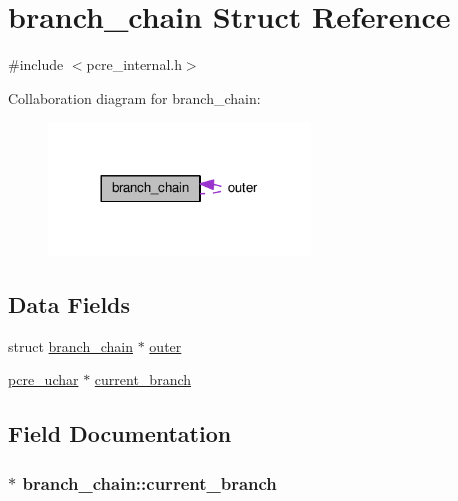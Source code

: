 \hypertarget{structbranch__chain}{}\section{branch\+\_\+chain Struct Reference}
\label{structbranch__chain}


{\ttfamily \#include $<$pcre\+\_\+internal.\+h$>$}



Collaboration diagram for branch\+\_\+chain\+:
\nopagebreak
\begin{figure}[H]
\begin{center}
\leavevmode
\includegraphics[width=197pt]{structbranch__chain__coll__graph}
\end{center}
\end{figure}
\subsection*{Data Fields}
\begin{DoxyCompactItemize}
\item 
struct \hyperlink{structbranch__chain}{branch\+\_\+chain} $\ast$ \hyperlink{structbranch__chain_a31ea7a80e9f42fabbcd2c63103f8528a}{outer}
\item 
\hyperlink{pcre__internal_8h_a9d8efd0ad5b191db2a1793268600deb9}{pcre\+\_\+uchar} $\ast$ \hyperlink{structbranch__chain_acbf27df76e0dafd0a2d69a435249242b}{current\+\_\+branch}
\end{DoxyCompactItemize}


\subsection{Field Documentation}
\subsubsection[{\texorpdfstring{current\+\_\+branch}{current_branch}}]{$\ast$ branch\+\_\+chain\+::current\+\_\+branch}\hypertarget{structbranch__chain_acbf27df76e0dafd0a2d69a435249242b}{}\label{structbranch__chain_acbf27df76e0dafd0a2d69a435249242b}
